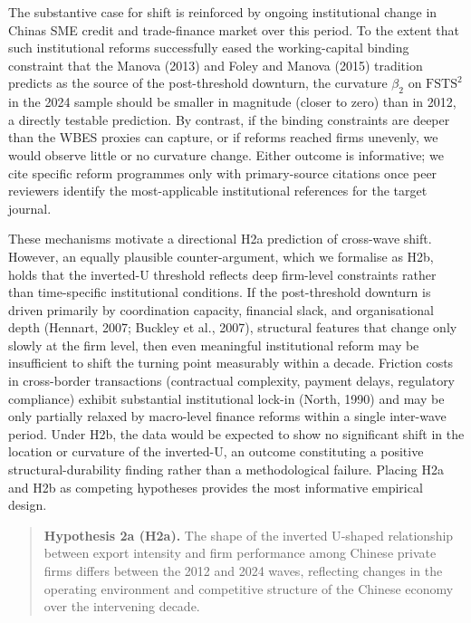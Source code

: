 \documentclass[12pt,a4paper]{article}
\begin{document}
The substantive case for shift is reinforced by ongoing institutional
change in China\textquotesingle s SME credit and trade-finance market
over this period. To the extent that such institutional reforms
successfully eased the working-capital binding constraint that the
Manova (2013) and Foley and Manova (2015) tradition predicts as the
source of the post-threshold downturn, the curvature \(\beta_2\) on
\(\mathrm{FSTS}^2\) in the 2024 sample should be smaller in magnitude
(closer to zero) than in 2012, a directly testable prediction. By
contrast, if the binding constraints are deeper than the WBES proxies
can capture, or if reforms reached firms unevenly, we would observe
little or no curvature change. Either outcome is informative; we cite
specific reform programmes only with primary-source citations once peer
reviewers identify the most-applicable institutional references for the
target journal.

These mechanisms motivate a directional H2a prediction of cross-wave
shift. However, an equally plausible counter-argument, which we
formalise as H2b, holds that the inverted-U threshold reflects deep
firm-level constraints rather than time-specific institutional
conditions. If the post-threshold downturn is driven primarily by
coordination capacity, financial slack, and organisational depth
(Hennart, 2007; Buckley et al., 2007), structural features that change
only slowly at the firm level, then even meaningful institutional reform
may be insufficient to shift the turning point measurably within a
decade. Friction costs in cross-border transactions (contractual
complexity, payment delays, regulatory compliance) exhibit substantial
institutional lock-in (North, 1990) and may be only partially relaxed by
macro-level finance reforms within a single inter-wave period. Under
H2b, the data would be expected to show no significant shift in the
location or curvature of the inverted-U, an outcome constituting a
positive structural-durability finding rather than a methodological
failure. Placing H2a and H2b as competing hypotheses provides the most
informative empirical design.

\begin{quote}
\textbf{Hypothesis 2a (H2a).} The shape of the inverted U‑shaped
relationship between export intensity and firm performance among Chinese
private firms differs between the 2012 and 2024 waves, reflecting
changes in the operating environment and competitive structure of the
Chinese economy over the intervening decade.
\end{quote}
\end{document}
